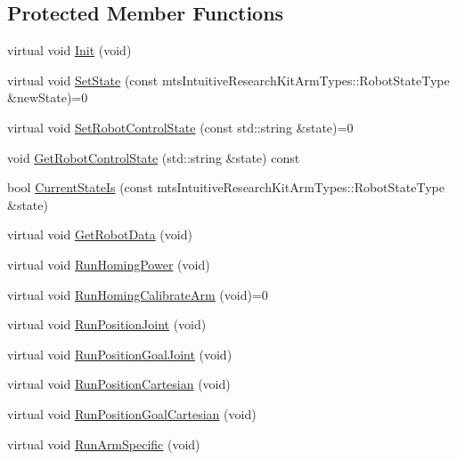\subsection*{Protected Member Functions}
\begin{DoxyCompactItemize}
\item 
virtual void \hyperlink{classmts_intuitive_research_kit_arm_a0ca9419383cc357218f1ab25b9da5405}{Init} (void)
\item 
virtual void \hyperlink{classmts_intuitive_research_kit_arm_a71ac45020e7a77ce3892e4dc312adec3}{Set\-State} (const mts\-Intuitive\-Research\-Kit\-Arm\-Types\-::\-Robot\-State\-Type \&new\-State)=0
\item 
virtual void \hyperlink{classmts_intuitive_research_kit_arm_ae2e2808687bca1fcd58d6a3495d9820d}{Set\-Robot\-Control\-State} (const std\-::string \&state)=0
\item 
void \hyperlink{classmts_intuitive_research_kit_arm_aec0a1efd9c248846c9c2b61373ac8156}{Get\-Robot\-Control\-State} (std\-::string \&state) const 
\item 
bool \hyperlink{classmts_intuitive_research_kit_arm_acdb4931355a26f809d08721340470c4a}{Current\-State\-Is} (const mts\-Intuitive\-Research\-Kit\-Arm\-Types\-::\-Robot\-State\-Type \&state)
\item 
virtual void \hyperlink{classmts_intuitive_research_kit_arm_ae8385abbcb7164a7232a70f8f90230ad}{Get\-Robot\-Data} (void)
\item 
virtual void \hyperlink{classmts_intuitive_research_kit_arm_ab18b06b059aee25f6671ae33a4d9cbeb}{Run\-Homing\-Power} (void)
\item 
virtual void \hyperlink{classmts_intuitive_research_kit_arm_ab61f28ceeede413541382e49ae092600}{Run\-Homing\-Calibrate\-Arm} (void)=0
\item 
virtual void \hyperlink{classmts_intuitive_research_kit_arm_a47b6d6b34097d8d3b9a2b701ebf7fd64}{Run\-Position\-Joint} (void)
\item 
virtual void \hyperlink{classmts_intuitive_research_kit_arm_a786351a40b8b92f120d25253496f918d}{Run\-Position\-Goal\-Joint} (void)
\item 
virtual void \hyperlink{classmts_intuitive_research_kit_arm_a2cef8afff57646cafccdb804d02dc88c}{Run\-Position\-Cartesian} (void)
\item 
virtual void \hyperlink{classmts_intuitive_research_kit_arm_af144fbdcfb8d1d4090a805d7ba2fbb83}{Run\-Position\-Goal\-Cartesian} (void)
\item 
virtual void \hyperlink{classmts_intuitive_research_kit_arm_a178322f557694c5f9363047f84560504}{Run\-Arm\-Specific} (void)

\end{DoxyCompactItemize}
